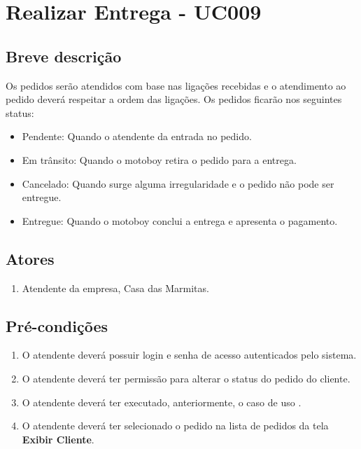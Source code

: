 \chapter{Realizar Entrega - UC009} \label{uc009}

\section{Breve descrição}

Os pedidos serão atendidos com base nas ligações recebidas e o atendimento ao pedido deverá respeitar a ordem das ligações. Os pedidos ficarão nos seguintes status:

\begin{itemize}
	\item Pendente: Quando o atendente da entrada no pedido.
	\item Em trânsito: Quando o motoboy retira o pedido para a entrega.
	\item Cancelado: Quando surge alguma irregularidade e o pedido não pode ser entregue.
	\item Entregue: Quando o motoboy conclui a entrega e apresenta o pagamento.
\end{itemize}

\section{Atores}

\begin{enumerate}
	\item Atendente da empresa, Casa das Marmitas.
\end{enumerate}

\section{Pré-condições}

\begin{enumerate}
	\item O atendente deverá possuir login e senha de acesso autenticados pelo sistema.
	\item O atendente deverá ter permissão para alterar o status do pedido do cliente.
	\item O atendente deverá ter executado, anteriormente, o caso de uso .
	\item O atendente deverá ter selecionado o pedido na lista de pedidos da tela \textbf{Exibir Cliente}.
\end{enumerate}

